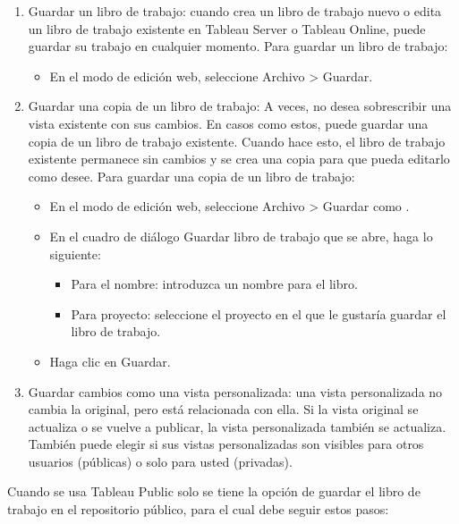 \documentclass[
]{book}
\providecommand{\tightlist}{%
  \setlength{\itemsep}{0pt}\setlength{\parskip}{0pt}}
\begin{document}
\begin{enumerate}
\def\labelenumi{\arabic{enumi}.}
\tightlist
\item
  Guardar un libro de trabajo: cuando crea un libro de trabajo nuevo o edita un libro de trabajo existente en Tableau Server o Tableau Online, puede guardar su trabajo en cualquier momento. Para guardar un libro de trabajo:

  \begin{itemize}
  \tightlist
  \item
    En el modo de edición web, seleccione Archivo \textgreater{} Guardar.
  \end{itemize}
\item
  Guardar una copia de un libro de trabajo: A veces, no desea sobrescribir una vista existente con sus cambios. En casos como estos, puede guardar una copia de un libro de trabajo existente. Cuando hace esto, el libro de trabajo existente permanece sin cambios y se crea una copia para que pueda editarlo como desee. Para guardar una copia de un libro de trabajo:

  \begin{itemize}
  \tightlist
  \item
    En el modo de edición web, seleccione Archivo \textgreater{} Guardar como .
  \item
    En el cuadro de diálogo Guardar libro de trabajo que se abre, haga lo
    siguiente:

    \begin{itemize}
    \tightlist
    \item
      Para el nombre: introduzca un nombre para el libro.
    \item
      Para proyecto: seleccione el proyecto en el que le gustaría guardar
      el libro de trabajo.
    \end{itemize}
  \item
    Haga clic en Guardar.
  \end{itemize}
\item
  Guardar cambios como una vista personalizada: una vista personalizada no cambia la original, pero está relacionada con ella. Si la vista original se actualiza o se vuelve a publicar, la vista personalizada también se actualiza. También puede elegir si sus vistas personalizadas son visibles para otros usuarios (públicas) o solo para usted (privadas).
\end{enumerate}

Cuando se usa Tableau Public solo se tiene la opción de guardar el libro de trabajo en el repositorio público, para el cual debe seguir estos pasos:
\end{document}
